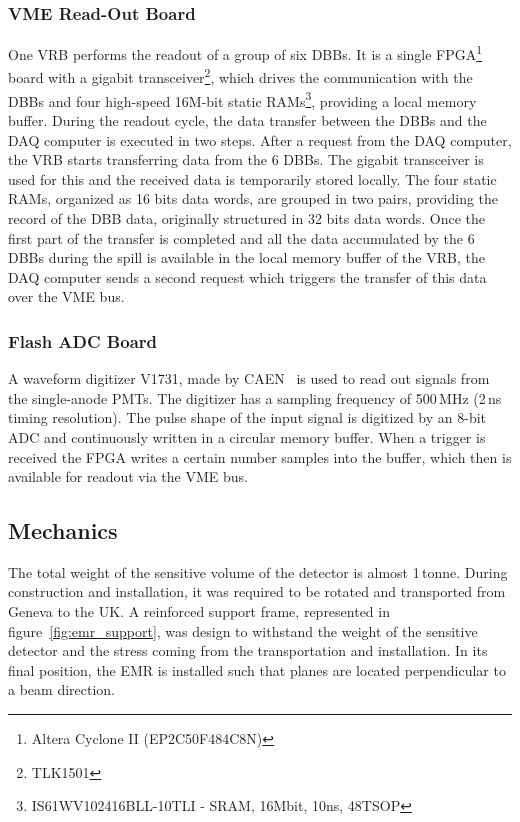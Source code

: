 \documentclass[a4paper,11pt]{article}
\begin{document}
\subsubsection{VME Read-Out Board}\label{electronics:subsec:vme_readout_board}

One VRB performs the readout of a group of six DBBs. It is a single FPGA\footnote{Altera Cyclone II (EP2C50F484C8N)} board with a gigabit 
transceiver\footnote{TLK1501}, which drives the communication with the DBBs and four high-speed 16M-bit static RAMs\footnote{IS61WV102416BLL-10TLI
- SRAM, 16Mbit, 10ns, 48TSOP}, providing a local memory buffer. During the readout cycle, the data transfer between the DBBs and the DAQ computer
is executed in two steps. After a request from the DAQ computer, the VRB starts transferring data from the 6 DBBs. The gigabit transceiver is used
for this and the received data is temporarily stored locally. The four static RAMs, organized as 16 bits data words, are grouped in two pairs,
providing the record of the DBB data, originally structured in 32 bits data words. Once the first part of the transfer is completed and all
the data accumulated by the 6 DBBs during the spill is available in the local memory buffer of the VRB, the DAQ computer sends a second request which
triggers the transfer of this data over the VME bus.

\subsubsection{Flash ADC Board}\label{electronics:subsec:fast_adc_board}

A waveform digitizer V1731, made by CAEN~\cite{V1731} is used to read out signals from the single-anode PMTs. The digitizer has a sampling frequency of 500\,MHz (2\,ns timing resolution). The pulse shape of the input signal is digitized by an 8-bit ADC and continuously written in a circular memory
buffer. When a trigger is received the FPGA writes a certain number samples into the buffer, which
then is available for readout via the VME bus.

\subsection{Mechanics}\label{design:subsec:mechanics}

The total weight of the sensitive volume of the detector is almost 1\,tonne. During construction and installation, it was required to be rotated and transported from Geneva to the UK. A reinforced support frame, represented in figure~\ref{fig:emr_support},
was design to withstand the weight of the sensitive detector and the stress coming from the transportation and installation. In its
final position, the EMR is installed such that planes are located perpendicular to a beam direction. 
\end{document}
